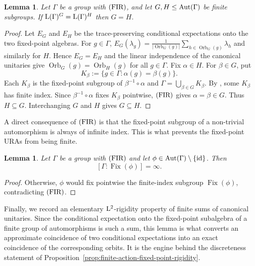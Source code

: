 \documentclass[12pt]{amsart} %
\theoremstyle{plain}
\newtheorem{lemma}[theorem]{Lemma}
\theoremstyle{definition}
\newcommand{\id}{{\rm id}}
\newcommand{\LL}{{\rm L}}
\newcommand{\Aut}{{\rm Aut}}
\begin{document}
\begin{lemma}\label{lem:finite-fixed-point-action-rigidity}
Let $\Gamma$ be a group with ${\rm(FIR)}$, and let
$G,H\leq\Aut(\Gamma)$ be finite subgroups. If $\LL(\Gamma)^G=\LL(\Gamma)^H$ then $G=H$.
\end{lemma}
\begin{proof}
Let $E_G$ and $E_H$ be the trace-preserving conditional expectations onto
the two fixed-point algebras. For $g\in\Gamma$, $E_G(\lambda_g)=
\frac1{|\operatorname{Orb}_G(g)|}
\sum_{h\in\operatorname{Orb}_G(g)}\lambda_h$
and similarly for $H$. Hence $E_G=E_H$ and the linear independence of the
canonical unitaries give $\operatorname{Orb}_G(g)=\operatorname{Orb}_H(g)$ for all $g\in\Gamma$. Fix $\alpha\in H$. For $\beta\in G$, put
$$K_\beta:=\{g\in\Gamma:\alpha(g)=\beta(g)\}.$$
Each $K_\beta$ is the fixed-point subgroup of
$\beta^{-1}\circ\alpha$ and $\Gamma=\bigcup_{\beta\in G}K_\beta$. By \cite[Lemma~4.1]{neumann1954groups}, some $K_\beta$ has finite index.
Since $\beta^{-1}\circ\alpha$ fixes $K_\beta$ pointwise, ${\rm(FIR)}$ gives
$\alpha=\beta\in G$. Thus $H\subseteq G$. Interchanging $G$ and $H$ gives
$G\subseteq H$.
\end{proof}

\noindent A direct consequence of ${\rm(FIR)}$ is that the fixed-point subgroup
of a non-trivial automorphism is always of infinite index. This is what
prevents the fixed-point URAs from being finite.
\medskip

\begin{lemma}\label{lem: finite order automorphism has infinite index fixed point subgroups}
Let $\Gamma$ be a group with ${\rm(FIR)}$ and let
$\phi\in\Aut(\Gamma)\setminus\{\id\}$. Then
$$
[\Gamma:\operatorname{Fix}(\phi)]=\infty.
$$
\end{lemma}
\begin{proof}
Otherwise, $\phi$ would fix pointwise the finite-index subgroup
$\operatorname{Fix}(\phi)$, contradicting ${\rm(FIR)}$.
\end{proof}

\noindent Finally, we record an elementary $\LL^2$-rigidity property of finite
sums of canonical unitaries. Since the conditional expectation onto the
fixed-point subalgebra of a finite group of automorphisms is such a sum, this lemma is what converts an approximate
coincidence of two conditional expectations into an exact coincidence of the
corresponding orbits. It is the engine behind the discreteness statement of
Proposition~\ref{prop:finite-action-fixed-point-rigidity}.
\medskip
\end{document}
